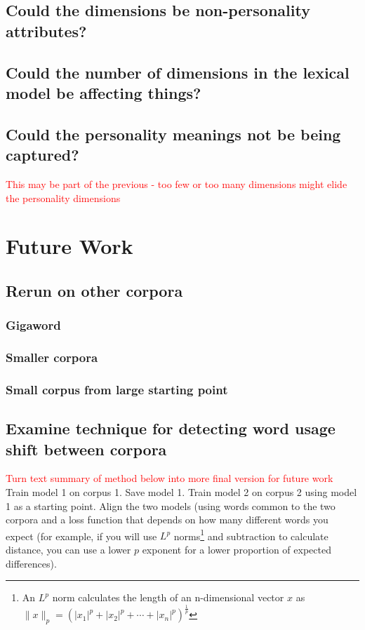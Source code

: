 \documentclass[10pt,letterpaper]{book}
\newcommand{\todo}[1]{\textcolor{red}{#1}}
\begin{document}
\section{Could the dimensions be non-personality attributes?}

\section{Could the number of dimensions in the lexical model be affecting things?}

\section{Could the personality meanings not be being captured?}

\todo{This may be part of the previous - too few or too many dimensions might elide the personality dimensions}

\chapter{Future Work}

\section{Rerun on other corpora}

\subsection{Gigaword}
\subsection{Smaller corpora}
\subsection{Small corpus from large starting point}

\section{Examine technique for detecting word usage shift between corpora}

\todo{Turn text summary of method below into more final version for future work}
Train model 1 on corpus 1. Save model 1. Train model 2 on corpus 2 using model 1 as a starting point. Align the two models (using words common to the two corpora and a loss function that depends on how many different words you expect (for example, if you will use $L^p$ norms\footnote{An $L^p$ norm calculates the length of an n-dimensional vector $x$ as $\|x\|_p=\left(|x_1|^p+|x_2|^p+\dotsb+|x_n|^p\right)^{\frac{1}{p}}$} and subtraction to calculate distance, you can use a lower $p$ exponent for a lower proportion of expected differences).
\end{document}
